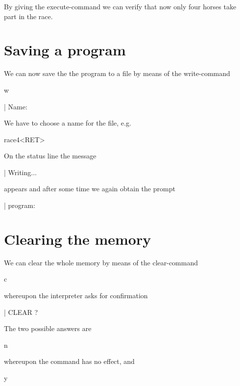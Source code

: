 \noindent
By giving the execute-command we can verify that now only four
horses take part in the race.

\section{Saving a program}

We can now save the the program to a file by means of the write-command

\begin{elan}
        w

|       Name:\cursor
\end{elan}

\noindent
We have to choose a name for the file, e.g.

\begin{elan}
        race4<RET>
\end{elan}

\noindent
On the status line the message

\begin{elan}
|                               Writing...
\end{elan}

\noindent
appears and after some time we again obtain the prompt

\begin{elan}
|       program:\cursor
\end{elan}

\section{Clearing the memory}

We can clear the whole memory by means of the clear-command

\begin{elan}
        c
\end{elan}

\noindent
whereupon the interpreter asks for confirmation

\begin{elan}
|       CLEAR ?\cursor
\end{elan}

\noindent
The two possible answers are

\begin{elan}
        n
\end{elan}

\noindent
whereupon the command has no effect, and

\begin{elan}
        y
\end{elan}

